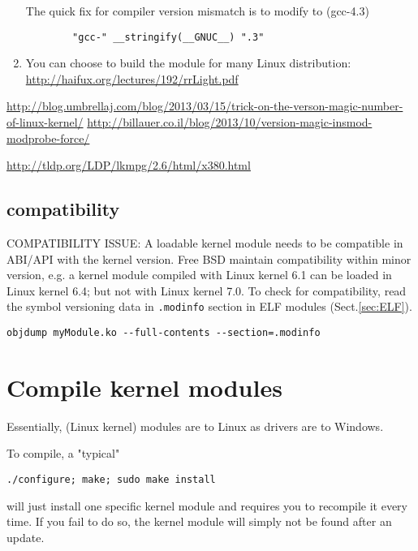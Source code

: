 \begin{enumerate}
The quick fix for compiler version mismatch is to modify to (gcc-4.3) 
\begin{verbatim}
        "gcc-" __stringify(__GNUC__) ".3"                                                                             
\end{verbatim}

  
 \item You can choose to build the module for many Linux distribution:
\url{http://haifux.org/lectures/192/rrLight.pdf}
 
\end{enumerate}

\url{http://blog.umbrellaj.com/blog/2013/03/15/trick-on-the-verson-magic-number-of-linux-kernel/}
\url{http://billauer.co.il/blog/2013/10/version-magic-insmod-modprobe-force/}


\url{http://tldp.org/LDP/lkmpg/2.6/html/x380.html}

\subsection{compatibility}

COMPATIBILITY ISSUE: A loadable kernel module needs to be compatible in ABI/API
with the kernel version. Free BSD maintain compatibility within minor version,
e.g. a kernel module compiled with Linux kernel 6.1 can be loaded in Linux
kernel 6.4; but not with Linux kernel 7.0. To check for compatibility, read the
symbol versioning data in \verb!.modinfo! section in ELF modules
(Sect.\ref{sec:ELF}).
\begin{verbatim}
objdump myModule.ko --full-contents --section=.modinfo
\end{verbatim}



\section{Compile kernel modules}
\label{sec:build-Linux-kernel-module}
\label{sec:LKM}
\label{sec:build-Linux-kernel-modules}

Essentially, (Linux kernel) modules are to Linux as drivers are to Windows.

To compile, a "typical" 
\begin{verbatim}
./configure; make; sudo make install 
\end{verbatim}
will just install one specific kernel module and requires you to recompile it
every time.  If you fail to do so, the kernel module will simply not be found
after an update.

